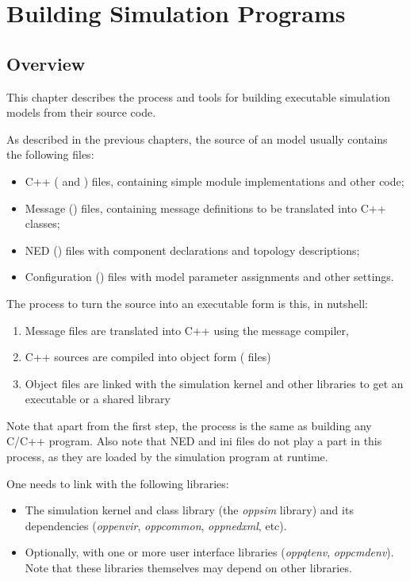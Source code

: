 \chapter{Building Simulation Programs}
\label{cha:build-sim-progs}

\section{Overview}
\label{sec:build-sim-progs:overview}

This chapter describes the process and tools for building executable simulation
models from their source code.

As described in the previous chapters, the source of an {\opp} model usually
contains the following files:

\begin{itemize}
  \item C++ ( and ) files, containing simple module
        implementations and other code;
  \item Message () files, containing message definitions to be
        translated into C++ classes;
  \item NED () files with component declarations and topology
        descriptions;
  \item Configuration () files with model parameter assignments and 
        other settings.
\end{itemize}

The process to turn the source into an executable form is this, in nutshell:

\begin{enumerate}
  \item Message files are translated into C++ using the message compiler,
  \item C++ sources are compiled into object form ( files)
  \item Object files are linked with the simulation kernel and other 
        libraries to get an executable or a shared library
\end{enumerate}

Note that apart from the first step, the process is the same as building any 
C/C++ program. Also note that NED and ini files do not play a part in this
process, as they are loaded by the simulation program at runtime.

One needs to link with the following libraries:

\begin{itemize}
  \item The simulation kernel and class library (the
        \textit{oppsim} library) and its dependencies (\textit{oppenvir},
        \textit{oppcommon}, \textit{oppnedxml}, etc).
  \item Optionally, with one or more user interface libraries
        (\textit{oppqtenv}, \textit{oppcmdenv}). Note that these libraries
        themselves may depend on other libraries.
\end{itemize}

